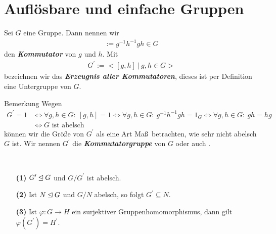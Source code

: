 \section{Auflösbare und einfache Gruppen}

\begin{df}\label{skript:4.1}  
	Sei $ G $ eine Gruppe. Dann nennen wir 
	\begin{align*}
	[g,h] := g^{-1}h^{-1}gh \in G
	\end{align*}
	den \textbf{\textit{Kommutator}} von $ g $ und $ h $. Mit 
	\begin{align*}
	G^\prime := < [g,h] \ | \ g,h \in G >
	\end{align*}
	bezeichnen wir das \textbf{\textit{Erzeugnis aller Kommutatoren}}, dieses ist per Definition eine Untergruppe von $ G $.
	
\end{df}

\begin{generic_no_num}{Bemerkung}  
	Wegen
	\begin{align*}
	G^\prime = 1 &\Leftrightarrow \forall g,h \in G : \ [g,h]= 1 
	\Leftrightarrow \forall g,h \in G : \ g^{-1}h^{-1}gh = 1_G
	\Leftrightarrow \forall g,h \in G : \ gh = hg \\
	&\Leftrightarrow G \text{ ist abelsch}
	\end{align*}
	können wir die Größe von $ G^\prime $ als eine Art \glqq Maß\grqq \ betrachten, wie sehr nicht abelsch $ G $ ist.
	Wir nennen $ G^\prime $ die \textbf{\textit{Kommutatorgruppe}} von $ G $ oder auch .
\end{generic_no_num}

\begin{sz}\label{skript:4.2} \
	\begin{enumerate}
		\item[\textbf{(1)}] $ G^\prime \unlhd G $ und $ G / G^\prime $ ist abelsch.
		\item[\textbf{(2)}] Ist $ N \unlhd G $ und $ G / N $ abelsch, so folgt $ G^\prime  \subseteq N $.
		\item[\textbf{(3)}] Ist $ \varphi : G \to H $ ein surjektiver Gruppenhomomorphismus, dann gilt $ \varphi(G^\prime)  = H^\prime$.
	\end{enumerate}
\end{sz}


